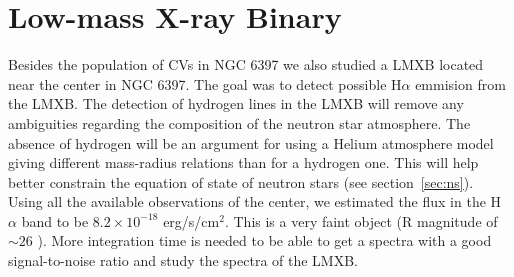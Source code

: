 \section{Low-mass X-ray Binary}


Besides the population of CVs in NGC 6397 we also studied a LMXB located near the center in NGC 6397. The goal was to detect possible H$\alpha$ emmision from the LMXB. The detection of hydrogen lines in the LMXB  will remove any ambiguities regarding the composition of the neutron star atmosphere. The absence of hydrogen  will be an argument for using a Helium atmosphere model giving different mass-radius relations than for a hydrogen one. This will help better constrain the equation of state of neutron stars (see section~\ref{sec:ns}). Using all the available observations of the center, we estimated the flux in the H $\alpha$ band to be $8.2 \times 10^{-18}$ erg/s/cm$^2$. This is a very faint object (R magnitude of $\sim 26$ \citep{heinke_improved_2014}). More integration time is needed to be able to get a spectra with a good signal-to-noise ratio and study the spectra of the LMXB. 


